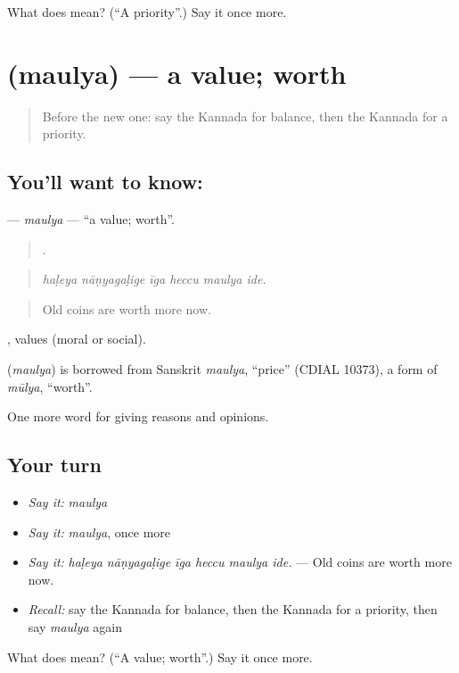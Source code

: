 \begin{tcolorbox}[breakable,colback=teal!4,colframe=teal!35!black,title={Before you move on}]
What does  mean? (\textquotedblleft{}A priority\textquotedblright{}.) Say it once more.
\end{tcolorbox}
\section[\texorpdfstring{\kn{ಮೌಲ್ಯ} (maulya)}{ಮೌಲ್ಯ (maulya)}]{ (maulya) — a value; worth}

\label{lesson:KA-C387-maulya}



\begin{quote}
Before the new one: say the Kannada for balance, then the Kannada for a priority.
\end{quote}

\subsection*{You'll want to know: }
\textbf{} — \emph{maulya} — \textquotedblleft{}a value; worth\textquotedblright{}.

\begin{quote}
     .
\end{quote}

\begin{quote}
\emph{haḷeya nāṇyagaḷige īga heccu maulya ide.}
\end{quote}

\begin{quote}
Old coins are worth more now.
\end{quote}

, values (moral or social).

\begin{cousinweb}
\textbf{} (\emph{maulya}) is borrowed from Sanskrit \emph{maulya}, \textquotedblleft{}price\textquotedblright{} (CDIAL 10373), a form of \emph{mūlya}, \textquotedblleft{}worth\textquotedblright{}.
\end{cousinweb}

\begin{grammarlens}[title={What you've built}]
One more word for giving reasons and opinions.
\end{grammarlens}

\subsection*{Your turn}
\begin{itemize}
\raggedright
  \item \emph{Say it:} \emph{maulya}
  \item \emph{Say it:} \emph{maulya}, once more
  \item \emph{Say it:} \emph{haḷeya nāṇyagaḷige īga heccu maulya ide.} — Old coins are worth more now.
  \item \emph{Recall:} say the Kannada for balance, then the Kannada for a priority, then say \emph{maulya} again
\end{itemize}

\begin{tcolorbox}[breakable,colback=teal!4,colframe=teal!35!black,title={Before you move on}]
What does  mean? (\textquotedblleft{}A value; worth\textquotedblright{}.) Say it once more.
\end{tcolorbox}
